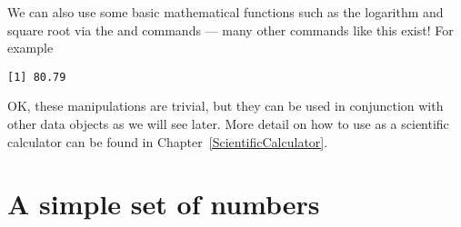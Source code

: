 We can also use some basic mathematical functions such as the logarithm and square root via the  and  commands --- many other commands like this exist! For example 
\begin{knitrout}
\color{fgcolor}\begin{kframe}
\begin{alltt}
\hlstd{> }\hlkwb{=}\hlstd{(}\hlstd{)}
\hlstd{> }\hlkwb{=}\hlstd{(}\hlstd{)}
\hlstd{> }\hlopt{*}
\end{alltt}
\begin{verbatim}
[1] 80.79
\end{verbatim}
\end{kframe}
\end{knitrout}
OK, these manipulations are trivial, but they can be used in conjunction with other data objects as we will see later. More detail on how to use \R{} as a scientific calculator can be found in Chapter~\ref{ScientificCalculator}. 
 
 
\section{A simple set of numbers} 
 

